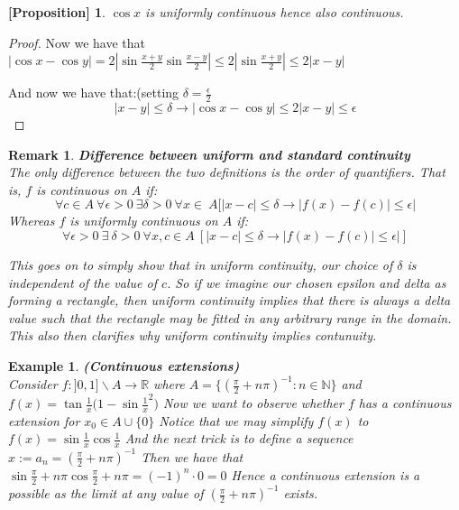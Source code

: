 \documentclass[titlepage]{article}
\newtheorem{remark}{Remark}[section]
\newtheorem{prop}{[Proposition]}
\numberwithin{equation}{subsection}
\newtheorem{example}{Example}[section]
\begin{document}
\begin{prop}
$\cos{x}$ is uniformly continuous hence also continuous.
\end{prop}

\begin{proof}
Now we have that $|\cos{x} - \cos{y}|=2|\sin{\frac{x+y}{2}}\sin{\frac{x-y}{2}}| \leq 2|\sin{\frac{x+y}{2}}|\leq 2|x-y|$

And now we have that:(setting $\delta = \frac{\epsilon}{2}$
$$|x-y|\leq \delta \rightarrow |\cos{x} - \cos{y}|\leq  2|x-y|\leq \epsilon$$
\end{proof}


\begin{remark}\textbf{Difference between uniform and standard continuity}
\\
The only difference between the two definitions is the order of quantifiers. That is, $f$ is continuous on $A$ if:
$$\forall c \in A \ \forall \epsilon > 0 \ \exists \delta > 0 \ \forall x \in \ A[ |x-c| \leq \delta \rightarrow |f(x) - f(c)|\leq \epsilon|$$ Whereas $f$ is uniformly continuous on $A$ if: 
$$\forall \epsilon > 0 \ \exists \ \delta > 0 \ \forall x,c \in A \ [|x-c| \leq \delta \rightarrow |f(x) - f(c)|\leq \epsilon|]$$

This goes on to simply show that in uniform continuity, our choice of $\delta$ is independent of the value of $c$. So if we imagine our chosen epsilon and delta as forming a rectangle, then uniform continuity implies that there is always a delta value such that the rectangle may be fitted in any arbitrary range in the domain. This also then clarifies why uniform continuity implies contunuity. 
\end{remark}

\begin{example}\textbf{(Continuous extensions)}
\\
Consider $f:]0,1]\backslash A \to \mathbb{R}$ where $A = \{(\frac{\pi}{2} + n\pi)^{-1} : n\in \mathbb{N} \}$ and $f(x) = \tan{\frac{1}{x}}(1-\sin{\frac{1}{x}^2)} $ Now we want to observe whether $f$ has a continuous extension for $x_{0} \in A \cup \{0\}$ Notice that we may simplify $f(x)$ to $f(x) = \sin{\frac{1}{x}}\cos{\frac{1}{x}}$ And the next trick is to define a sequence $ x:= a_{n} = (\frac{\pi}{2} + n\pi)^{-1} $ Then we have that $\sin{\frac{\pi}{2} + n\pi}\cos{\frac{\pi}{2} + n\pi} = (-1)^{n}\cdot 0 = 0$ Hence a continuous extension is a possible as the limit at any value of $(\frac{\pi}{2} + n\pi)^{-1}$ exists. 

\end{example}
\end{document}
